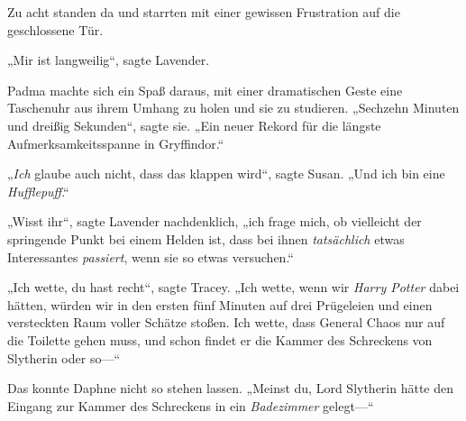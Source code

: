 Zu acht standen da und starrten mit einer gewissen Frustration auf die geschlossene Tür.

„Mir ist langweilig“, sagte Lavender.

Padma machte sich ein Spaß daraus, mit einer dramatischen Geste eine Taschenuhr aus ihrem Umhang zu holen und sie zu studieren. „Sechzehn Minuten und dreißig Sekunden“, sagte sie. „Ein neuer Rekord für die längste Aufmerksamkeitsspanne in Gryffindor.“

„\emph{Ich} glaube auch nicht, dass das klappen wird“, sagte Susan. „Und ich bin eine \emph{Hufflepuff}.“

„Wisst ihr“, sagte Lavender nachdenklich, „ich frage mich, ob vielleicht der springende Punkt bei einem Helden ist, dass bei ihnen \emph{tatsächlich} etwas Interessantes \emph{passiert}, wenn sie so etwas versuchen.“

„Ich wette, du hast recht“, sagte Tracey. „Ich wette, wenn wir \emph{Harry Potter} dabei hätten, würden wir in den ersten fünf Minuten auf drei Prügeleien und einen versteckten Raum voller Schätze stoßen. Ich wette, dass General Chaos nur auf die Toilette gehen muss, und schon findet er die Kammer des Schreckens von Slytherin oder so—“

Das konnte Daphne nicht so stehen lassen. „Meinst du, Lord Slytherin hätte den Eingang zur Kammer des Schreckens in ein \emph{Badezimmer} gelegt—“

